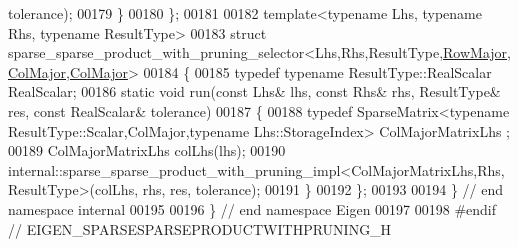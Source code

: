 \begin{DoxyCode}
      tolerance);
00179   \}
00180 \};
00181 
00182 \textcolor{keyword}{template}<\textcolor{keyword}{typename} Lhs, \textcolor{keyword}{typename} Rhs, \textcolor{keyword}{typename} ResultType>
00183 \textcolor{keyword}{struct }sparse\_sparse\_product\_with\_pruning\_selector<Lhs,Rhs,ResultType,\hyperlink{group__enums_ggaacded1a18ae58b0f554751f6cdf9eb13acfcde9cd8677c5f7caf6bd603666aae3}{RowMajor},
      \hyperlink{group__enums_ggaacded1a18ae58b0f554751f6cdf9eb13a0cbd4bdd0abcfc0224c5fcb5e4f6669a}{ColMajor},\hyperlink{group__enums_ggaacded1a18ae58b0f554751f6cdf9eb13a0cbd4bdd0abcfc0224c5fcb5e4f6669a}{ColMajor}>
00184 \{
00185   \textcolor{keyword}{typedef} \textcolor{keyword}{typename} ResultType::RealScalar RealScalar;
00186   \textcolor{keyword}{static} \textcolor{keywordtype}{void} run(\textcolor{keyword}{const} Lhs& lhs, \textcolor{keyword}{const} Rhs& rhs, ResultType& res, \textcolor{keyword}{const} RealScalar& tolerance)
00187   \{
00188     \textcolor{keyword}{typedef} SparseMatrix<typename ResultType::Scalar,ColMajor,typename Lhs::StorageIndex> ColMajorMatrixLhs
      ;
00189     ColMajorMatrixLhs colLhs(lhs);
00190     internal::sparse\_sparse\_product\_with\_pruning\_impl<ColMajorMatrixLhs,Rhs,ResultType>(colLhs, rhs, res, 
      tolerance);
00191   \}
00192 \};
00193 
00194 \} \textcolor{comment}{// end namespace internal}
00195 
00196 \} \textcolor{comment}{// end namespace Eigen}
00197 
00198 \textcolor{preprocessor}{#endif // EIGEN\_SPARSESPARSEPRODUCTWITHPRUNING\_H}
\end{DoxyCode}
